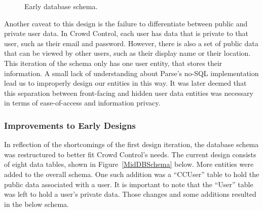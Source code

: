 	\begin{figure}[tbh]
	\begin{center}
	\end{center}
	\caption{Early database schema. \label{EarlyDBSchema}}
	\end{figure}

Another caveat to this design is the failure to differentiate between public and private user data. In Crowd Control, each user has data that is private to that user, such as their email and password. However, there is also a set of public data that can be viewed by other users, such as their display name or their location. This iteration of the schema only has one user entity, that stores their information. A small lack of understanding about Parse's no-SQL implementation lead us to improperly design our entities in this way. It was later deemed that this separation between front-facing and hidden user data entities was necessary in terms of ease-of-access and information privacy.

\subsubsection{Improvements to Early Designs}
In reflection of the shortcomings of the first design iteration, the database schema was restructured to better fit Crowd Control's needs. The current design consists of eight data tables,  shown in Figure~\ref{MidDBSchema} below. More entities were added to the overall schema. One such addition was a ``CCUser'' table to hold the public data associated with a user. It is important to note that the ``User'' table was left to hold a user's private data. Those changes and some additions resulted in the below schema. 

